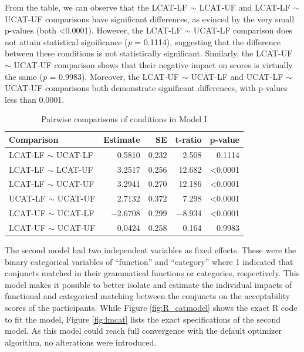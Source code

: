 From the table, we can observe that the LCAT-LF $\sim$ LCAT-UF and LCAT-LF $\sim$ UCAT-UF comparisons have significant differences, as evinced by the very small p-values (both <0.0001). However, the LCAT-LF $\sim$ UCAT-LF comparison does not attain statistical significance (\textit{p} = 0.1114), suggesting that the difference between these conditions is not statistically significant. Similarly, the LCAT-UF $\sim$ UCAT-UF comparison shows that their negative impact on scores is virtually the same (\textit{p} = 0.9983). Moreover, the LCAT-UF $\sim$ UCAT-LF and UCAT-LF $\sim$ UCAT-UF comparisons both demonstrate significant differences, with p-values less than 0.0001.


\begin{table}[!ht]
	\centering
	\begin{tabular}{lrrrr}
		\textbf{Comparison} & \textbf{Estimate} & \textbf{SE} & \textbf{t-ratio} & \textbf{p-value} \\
		\hline \hline
		LCAT-LF $\sim$ UCAT-LF & 0.5810 & 0.232 & 2.508 & 0.1114 \\
		LCAT-LF $\sim$ LCAT-UF & 3.2517 & 0.256 & 12.682 & <0.0001 \\
		LCAT-LF $\sim$ UCAT-UF & 3.2941 & 0.270 & 12.186 & <0.0001 \\
		UCAT-LF $\sim$ UCAT-UF & 2.7132 & 0.372 & 7.298 & <0.0001 \\
		LCAT-UF $\sim$ UCAT-LF & $-$2.6708 & 0.299 & $-$8.934 & <0.0001 \\
		LCAT-UF $\sim$ UCAT-UF & 0.0424 & 0.258 & 0.164 & 0.9983 \\
		\hline
		\hline
	\end{tabular}
	\caption{Pairwise comparisons of conditions in Model I}
	\label{tab:comparisons}
\end{table}


The second model had two independent variables as fixed effects. These were the binary categorical variables of ``function'' and ``category'' where 1 indicated that conjuncts matched in their grammatical functions or categories, respectively. This model makes it possible to better isolate and estimate the individual impacts of functional and categorical matching between the conjuncts on the acceptability scores of the participants. While Figure \ref{fig:R_catmodel} shows the exact R code to fit the model, Figure \ref{fig:lmcat} lists the exact specifications of the second model. As this model could reach full convergence with the default optimizer algorithm, no alterations were introduced.


